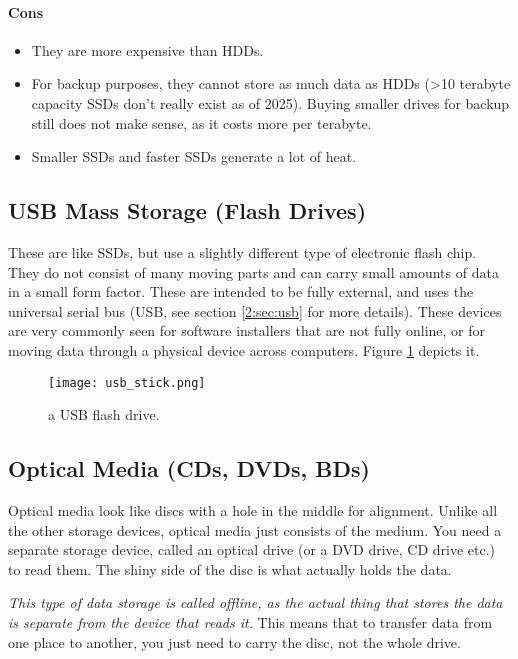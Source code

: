 \documentclass[../main.tex]{subfiles}
\begin{document}
\paragraph{Cons}
\begin{itemize}
    \item They are more expensive than HDDs.
    \item For backup purposes, they cannot store as much data as HDDs (>10 terabyte capacity SSDs don't really exist as of 2025). Buying smaller drives for backup still does not make sense, as it costs more per terabyte.
    \item Smaller SSDs and faster SSDs generate a lot of heat.
\end{itemize}

\subsection{USB Mass Storage (Flash Drives)}

These are like SSDs, but use a slightly different type of electronic flash chip. They do not consist of many moving parts and can carry small amounts of data in a small form factor. These are intended to be fully external, and uses the universal serial bus (USB, see section \ref{2:sec:usb} for more details). These devices are very commonly seen for software installers that are not fully online, or for moving data through a physical device across computers. Figure \ref{fig:usb_stick} depicts it.

\begin{figure}[H]
    \centering
    \texttt{[image: usb\_stick.png]}
    \caption{a USB flash drive.}
    \label{fig:usb_stick}
\end{figure}

\subsection{Optical Media (CDs, DVDs, BDs)}
\label{3:sec:optical_media}

Optical media look like discs with a hole in the middle for alignment. Unlike all the other storage devices, optical media just consists of the medium. You need a separate storage device, called an optical drive (or a DVD drive, CD drive etc.) to read them. The shiny side of the disc is what actually holds the data.

\emph{This type of data storage is called offline, as the actual thing that stores the data is separate from the device that reads it.} This means that to transfer data from one place to another, you just need to carry the disc, not the whole drive.
\end{document}
